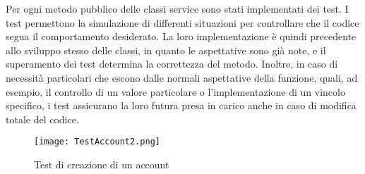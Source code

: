Per ogni metodo pubblico delle classi service sono stati implementati dei test.
I test permettono la simulazione di differenti situazioni
per controllare che il codice segua il comportamento desiderato.
La loro implementazione è quindi precedente allo sviluppo stesso delle classi,
in quanto le aspettative sono già note, e il superamento dei test determina la correttezza del metodo.
Inoltre, in caso di necessità particolari che escono dalle normali aspettative della funzione,
quali, ad esempio, il controllo di un valore particolare o l'implementazione di un vincolo specifico,
i test assicurano la loro futura presa in carico anche in caso di modifica totale del codice.\\
\begin{figure}[h!]
    \begin{center}
        \texttt{[image: TestAccount2.png]}
        \caption{Test di creazione di un account}
    \end{center}
\end{figure}

\clearpage



